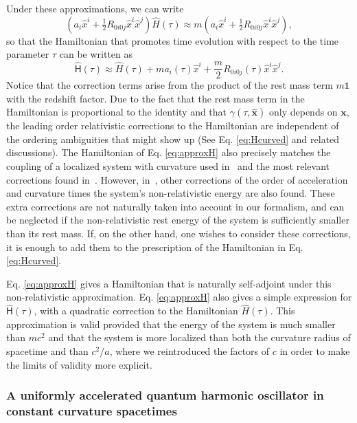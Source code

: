 \documentclass[letterpaper,12pt,titlepage,oneside,final]{book}
\newcommand{\openone}{\mathds{1}}
\begin{document}
Under these approximations, we can write
\begin{equation}
    \left(a_i \hat{x}^i + \tfrac{1}{2} R_{0i0j}\hat{x}^i\hat{x}^j\right)\!\hat{H}(\tau)\approx m\!\left(a_i \hat{x}^i + \tfrac{1}{2} R_{0i0j}\hat{x}^i\hat{x}^j\right),
\end{equation}
so that the Hamiltonian that promotes time evolution with respect to the time parameter $\tau$ can be written as
\begin{equation}\label{eq:approxH}
    \hat{\mathsf{H}}(\tau)\approx \hat{H}(\tau)+m  a_i(\tau) \hat{x}^i + \frac{m}{2}R_{0i0j}(\tau)\hat{x}^i \hat{x}^j.
\end{equation}
Notice that the correction terms arise from the product of the rest mass term $m\openone$ with the redshift factor. Due to the fact that the rest mass term in the Hamiltonian is proportional to the identity and that $\gamma(\tau,\hat{\bm x})$ only depends on $\bm x$, the leading order relativistic corrections to the Hamiltonian are independent of the ordering ambiguities that might show up (See Eq. \eqref{eq:Hcurved} and related discussions). The Hamiltonian of Eq. \eqref{eq:approxH} also precisely matches the coupling of a localized system with curvature used in~\cite{gravDetec,pitelli} and the most relevant corrections found in~\cite{jonas}. However, in~\cite{jonas}, other corrections of the order of acceleration and curvature times the system's non-relativistic energy are also found. These extra corrections are not naturally taken into account in our formalism, and can be neglected if the non-relativistic rest energy of the system is sufficiently smaller than its rest mass. If, on the other hand, one wishes to consider these corrections, it is enough to add them to the prescription of the Hamiltonian in Eq. \eqref{eq:Hcurved}.

Eq. \eqref{eq:approxH} gives a Hamiltonian that is naturally self-adjoint under this non-relativistic approximation. Eq. \eqref{eq:approxH} also gives a simple expression for $\hat{\mathsf{H}}(\tau)$, with a quadratic correction to the Hamiltonian $\hat{H}(\tau)$. This approximation is valid provided that the energy of the system is much smaller than $mc^2$ and that the system is more localized than both the curvature radius of spacetime and than $c^2/a$, where we reintroduced the factors of $c$ in order to make the limits of validity more explicit.

\subsubsection*{A uniformly accelerated quantum harmonic oscillator in constant curvature spacetimes}\label{sub:example}
\end{document}
